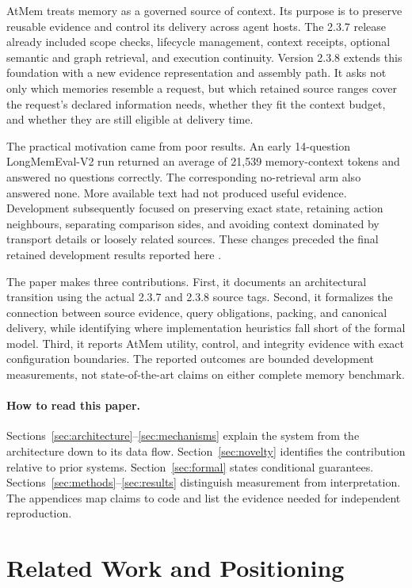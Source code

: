 \documentclass[11pt]{article}
\begin{document}
AtMem treats memory as a governed source of context. Its purpose is to preserve reusable evidence and control its delivery across agent hosts. The 2.3.7 release already included scope checks, lifecycle management, context receipts, optional semantic and graph retrieval, and execution continuity. Version 2.3.8 extends this foundation with a new evidence representation and assembly path. It asks not only which memories resemble a request, but which retained source ranges cover the request's declared information needs, whether they fit the context budget, and whether they are still eligible at delivery time.

The practical motivation came from poor results. An early 14-question LongMemEval-V2 run returned an average of 21,539 memory-context tokens and answered no questions correctly. The corresponding no-retrieval arm also answered none. More available text had not produced useful evidence. Development subsequently focused on preserving exact state, retaining action neighbours, separating comparison sides, and avoiding context dominated by transport details or loosely related sources. These changes preceded the final retained development results reported here \citep{history,results}.

The paper makes three contributions. First, it documents an architectural transition using the actual 2.3.7 and 2.3.8 source tags. Second, it formalizes the connection between source evidence, query obligations, packing, and canonical delivery, while identifying where implementation heuristics fall short of the formal model. Third, it reports AtMem utility, control, and integrity evidence with exact configuration boundaries. The reported outcomes are bounded development measurements, not state-of-the-art claims on either complete memory benchmark.

\paragraph{How to read this paper.}
Sections~\ref{sec:architecture}--\ref{sec:mechanisms} explain the system from the architecture down to its data flow. Section~\ref{sec:novelty} identifies the contribution relative to prior systems. Section~\ref{sec:formal} states conditional guarantees. Sections~\ref{sec:methods}--\ref{sec:results} distinguish measurement from interpretation. The appendices map claims to code and list the evidence needed for independent reproduction.

\section{Related Work and Positioning}
\end{document}
